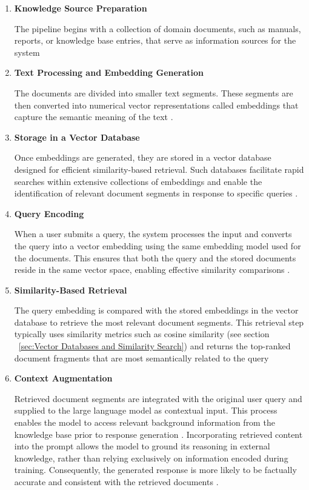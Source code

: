 \begin{enumerate}[label=\textbf{\arabic*.}]
    \item \textbf {Knowledge Source Preparation}
    
    The pipeline begins with a collection of domain documents, such as manuals, reports, or knowledge base entries, that serve as information sources for the system \cite{sahin_llm_2024}

    
    \item \textbf{Text Processing and Embedding Generation}
    
    The documents are divided into smaller text segments. These segments are then converted into numerical vector representations called embeddings that capture the semantic meaning of the text \cite{sahin_llm_2024}\cite{Holvoet2025RAG}.
    \item \textbf {Storage in a Vector Database}
    
    Once embeddings are generated, they are stored in a vector database \cite{Holvoet2025RAG} designed for efficient similarity-based retrieval. Such databases facilitate rapid searches within extensive collections of embeddings and enable the identification of relevant document segments in response to specific queries \cite{Rusum2024VectorDB}.
    \item \textbf {Query Encoding}

    When a user submits a query, the system processes the input and converts the query into a vector embedding using the same embedding model used for the documents. This ensures that both the query and the stored documents reside in the same vector space, enabling effective similarity comparisons \cite{sahin_llm_2024}.
    \item \textbf {Similarity-Based Retrieval}

    The query embedding is compared with the stored embeddings in the vector database to retrieve the most relevant document segments. This retrieval step typically uses similarity metrics such as cosine similarity (see section ~\ref{sec:Vector Databases and Similarity Search}) and returns the top-ranked document fragments that are most semantically related to the query 
    \cite{Rusum2024VectorDB}
    \item \textbf {Context Augmentation}

    Retrieved document segments are integrated with the original user query and supplied to the large language model as contextual input. This process enables the model to access relevant background information from the knowledge base prior to response generation \cite{sahin_llm_2024}. Incorporating retrieved content into the prompt allows the model to ground its reasoning in external knowledge, rather than relying exclusively on information encoded during training. Consequently, the generated response is more likely to be factually accurate and consistent with the retrieved documents \cite{chen_application_2025}.


\end{enumerate}
